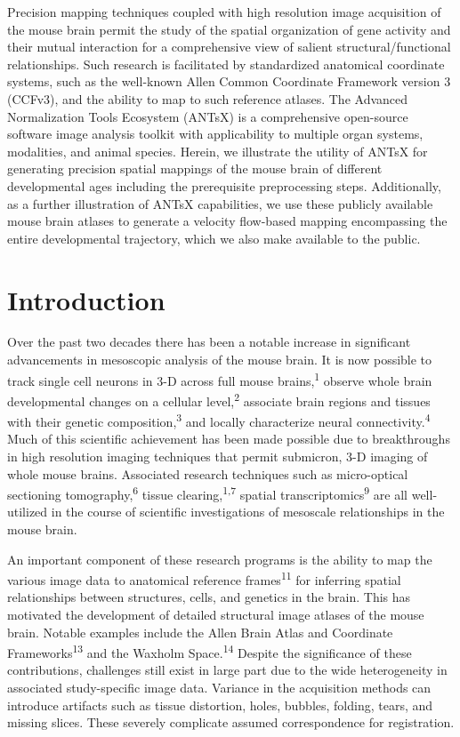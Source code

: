\documentclass[
  12pt,
]{article}
\begin{document}
Precision mapping techniques coupled with high resolution image
acquisition of the mouse brain permit the study of the spatial
organization of gene activity and their mutual interaction for a
comprehensive view of salient structural/functional relationships. Such
research is facilitated by standardized anatomical coordinate systems,
such as the well-known Allen Common Coordinate Framework version 3
(CCFv3), and the ability to map to such reference atlases. The Advanced
Normalization Tools Ecosystem (ANTsX) is a comprehensive open-source
software image analysis toolkit with applicability to multiple organ
systems, modalities, and animal species. Herein, we illustrate the
utility of ANTsX for generating precision spatial mappings of the mouse
brain of different developmental ages including the prerequisite
preprocessing steps. Additionally, as a further illustration of ANTsX
capabilities, we use these publicly available mouse brain atlases to
generate a velocity flow-based mapping encompassing the entire
developmental trajectory, which we also make available to the public.

\clearpage

\hypertarget{introduction}{%
\section*{Introduction}\label{introduction}}

Over the past two decades there has been a notable increase in
significant advancements in mesoscopic analysis of the mouse brain. It
is now possible to track single cell neurons in 3-D across full mouse
brains,\textsuperscript{1} observe whole brain developmental changes on
a cellular level,\textsuperscript{2} associate brain regions and tissues
with their genetic composition,\textsuperscript{3} and locally
characterize neural connectivity.\textsuperscript{4} Much of this
scientific achievement has been made possible due to breakthroughs in
high resolution imaging techniques that permit submicron, 3-D imaging of
whole mouse brains. Associated research techniques such as micro-optical
sectioning tomography,\textsuperscript{6} tissue
clearing,\textsuperscript{1,7} spatial
transcriptomics\textsuperscript{9} are all well-utilized in the course
of scientific investigations of mesoscale relationships in the mouse
brain.

An important component of these research programs is the ability to map
the various image data to anatomical reference
frames\textsuperscript{11} for inferring spatial relationships between
structures, cells, and genetics in the brain. This has motivated the
development of detailed structural image atlases of the mouse brain.
Notable examples include the Allen Brain Atlas and Coordinate
Frameworks\textsuperscript{13} and the Waxholm
Space.\textsuperscript{14} Despite the significance of these
contributions, challenges still exist in large part due to the wide
heterogeneity in associated study-specific image data. Variance in the
acquisition methods can introduce artifacts such as tissue distortion,
holes, bubbles, folding, tears, and missing slices. These severely
complicate assumed correspondence for registration.
\end{document}
